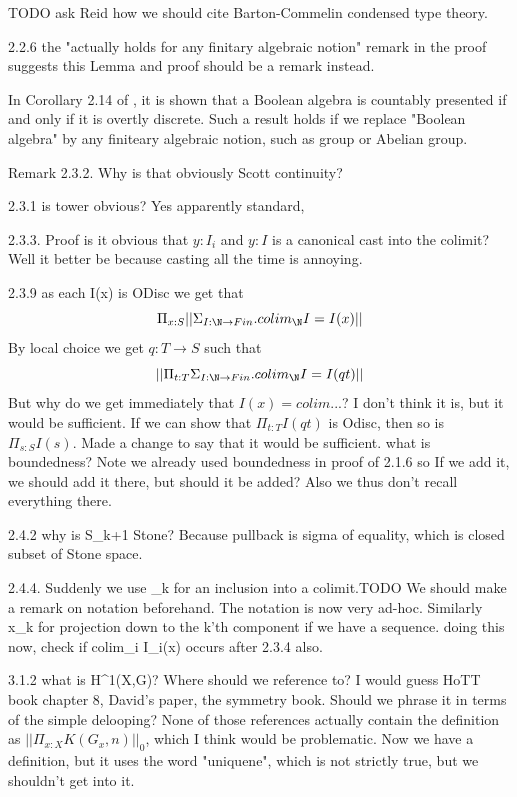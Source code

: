 TODO ask Reid how we should cite Barton-Commelin condensed type theory. 

2.2.6 the "actually holds for any finitary algebraic notion" remark in the proof suggests this Lemma and proof should be a remark instead. 
\begin{remark}
  In Corollary 2.14 of \cite{synthetic-stone-duality}, it is shown that a Boolean algebra is countably presented if and only if it is overtly discrete. Such a result holds if we replace "Boolean algebra" by any finiteary algebraic notion, such as group or Abelian group. 
\end{remark}

Remark 2.3.2. Why is that obviously Scott continuity? 

2.3.1 is tower obvious? Yes apparently standard, 

2.3.3. Proof is it obvious that $y:I_i$ and $y:I$ is a canonical cast into the colimit? Well it better be because casting all the time is annoying. 

2.3.9 as each I(x) is ODisc we get that 
$$\Pi_{x:S} || \Sigma_{I:\N \to Fin}. colim_{\N}I = I (x)||$$
By local choice we get $q : T \to S$ such that 
$$||\Pi_{t:T} \Sigma_{I:\N \to Fin}. colim_{\N}I = I (qt)||$$
But why do we get immediately that $I(x) = colim...$? 
I don't think it is, but it would be sufficient. If we can show that $\Pi_{t:T} I(qt)$ is Odisc, then so is $\Pi_{s:S} I(s)$. 
Made a change to say that it would be sufficient. 
what is boundedness? Note we already used boundedness in proof of 2.1.6 so If we add it, we should add it there, but should it be added? Also we thus don't recall everything there. 

2.4.2 why is S_{k+1} Stone? Because pullback is sigma of equality, which is closed subset of Stone space. 

2.4.4. Suddenly we use \iota_k for an inclusion into a colimit.TODO We should make a remark on notation beforehand. The notation is now very ad-hoc. Similarly x_k for projection down to the k'th component if we have a sequence. 
doing this now, check if colim_i I_i(x) occurs after 2.3.4 also. 

3.1.2 what is H^1(X,G)? Where should we reference to? I would guess HoTT book chapter 8, David's paper, the symmetry book. Should we phrase it in terms of the simple delooping? None of those references actually contain the definition as $||\Pi_{x:X} K(G_x,n)||_0$, which I think would be problematic. 
Now we have a definition, but it uses the word "uniquene", which is not strictly true, but we shouldn't get into it. 

